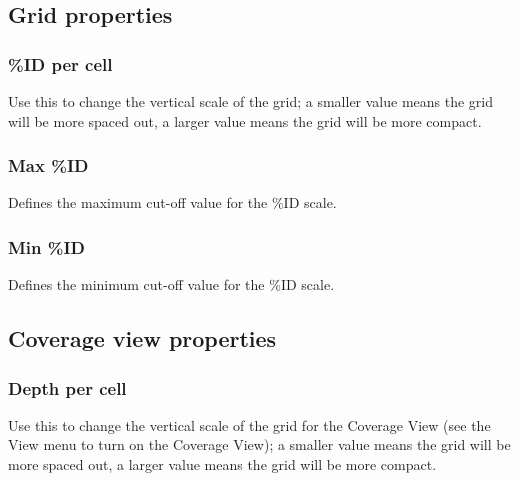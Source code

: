 \documentclass[letterpaper]{article}
\begin{document}
\bigskip

{\color[rgb]{0.30980393,0.5058824,0.7411765}\subsection[Grid properties]{Grid properties}}
\hypertarget{RefHeading2541056909880}{}\label{bkm:RefHeading2541056909880}
{\color[rgb]{0.30980393,0.5058824,0.7411765}\subsubsection[\%ID per cell]{\%ID per cell}}
\hypertarget{RefHeading2561056909880}{}{
Use this to change the vertical scale of the grid; a smaller value means
the grid will be more spaced out, a larger value means the grid will be
more compact.}

\bigskip

{\color[rgb]{0.30980393,0.5058824,0.7411765}\subsubsection[Max \%ID]{Max \%ID}}
\hypertarget{RefHeading2581056909880}{}{
Defines the maximum cut-off value for the \%ID scale.}

\bigskip

{\color[rgb]{0.30980393,0.5058824,0.7411765}\subsubsection[Min \%ID]{Min \%ID}}
\hypertarget{RefHeading2601056909880}{}{
Defines the minimum cut-off value for the \%ID scale.}

\bigskip

{\color[rgb]{0.30980393,0.5058824,0.7411765}\subsection[Coverage view properties]{Coverage view properties}}
\hypertarget{RefHeading334516266717}{}
{\color[rgb]{0.30980393,0.5058824,0.7411765}\subsubsection[Depth per
cell]{Depth per cell}}
\hypertarget{RefHeading334716266717}{}{
Use this to change the vertical scale of the grid for the Coverage View
(see the View menu to turn on the Coverage View); a smaller value means
the grid will be more spaced out, a larger value means the grid will be
more compact.}
\end{document}
